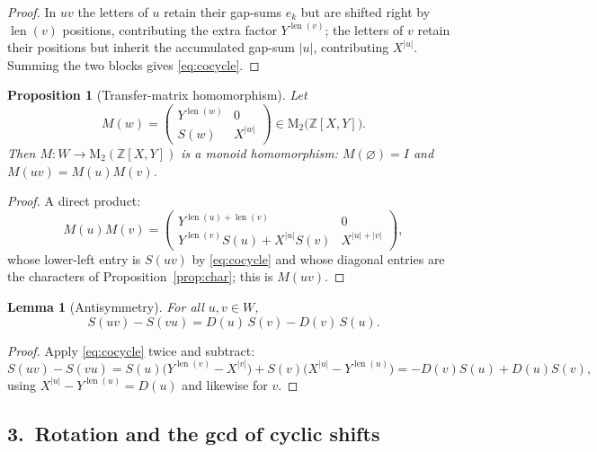 \documentclass[11pt,a4paper]{article}
\theoremstyle{bourbaki}
\newtheorem{prop}[thm]{Proposition}
\newtheorem{lem}[thm]{Lemma}
\theoremstyle{bourbakidef}
\newcommand{\Z}{\mathbb{Z}}
\DeclareMathOperator{\len}{len}
\begin{document}
\begin{proof}
In $uv$ the letters of $u$ retain their gap-sums $e_{k}$ but are shifted right by
$\len(v)$ positions, contributing the extra factor $Y^{\len(v)}$; the letters of $v$
retain their positions but inherit the accumulated gap-sum $\lvert u\rvert$,
contributing $X^{\lvert u\rvert}$. Summing the two blocks gives \eqref{eq:cocycle}.
\end{proof}

\begin{prop}[Transfer-matrix homomorphism]\label{prop:transfer}
Let
\[
   M(w)=\begin{pmatrix} Y^{\len(w)} & 0\\[2pt] S(w) & X^{\lvert w\rvert}\end{pmatrix}
   \in \mathrm{M}_{2}\bigl(\Z[X,Y]\bigr).
\]
Then $M:W\to \mathrm{M}_{2}(\Z[X,Y])$ is a monoid homomorphism: $M(\varnothing)=I$ and
$M(uv)=M(u)M(v)$.
\end{prop}

\begin{proof}
A direct product:
\[
   M(u)M(v)=
   \begin{pmatrix} Y^{\len(u)+\len(v)} & 0\\[2pt]
       Y^{\len(v)}S(u)+X^{\lvert u\rvert}S(v) & X^{\lvert u\rvert+\lvert v\rvert}\end{pmatrix},
\]
whose lower-left entry is $S(uv)$ by \eqref{eq:cocycle} and whose diagonal entries are the
characters of Proposition~\ref{prop:char}; this is $M(uv)$.
\end{proof}

\begin{lem}[Antisymmetry]\label{lem:antisym}
For all $u,v\in W$,
\begin{equation}\label{eq:antisym}
   S(uv)-S(vu)=D(u)\,S(v)-D(v)\,S(u).
\end{equation}
\end{lem}

\begin{proof}
Apply \eqref{eq:cocycle} twice and subtract:
\[
   S(uv)-S(vu)=S(u)\bigl(Y^{\len(v)}-X^{\lvert v\rvert}\bigr)
              +S(v)\bigl(X^{\lvert u\rvert}-Y^{\len(u)}\bigr)
            =-D(v)S(u)+D(u)S(v),
\]
using $X^{\lvert u\rvert}-Y^{\len(u)}=D(u)$ and likewise for $v$.
\end{proof}

\subsection*{3.\ Rotation and the gcd of cyclic shifts}
\end{document}
